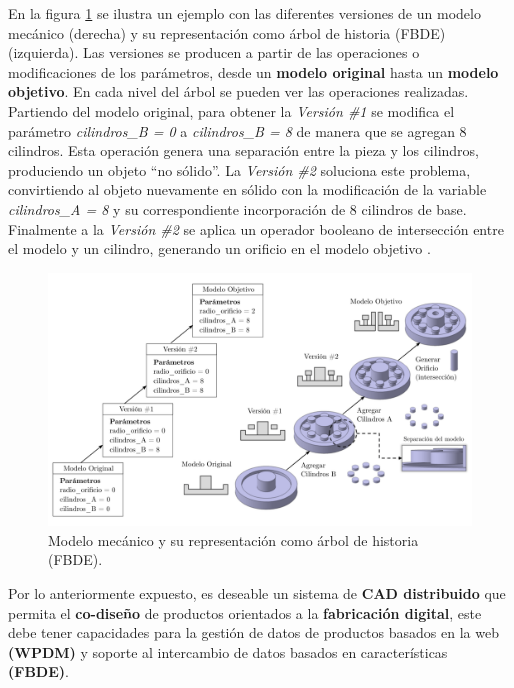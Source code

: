 En la figura \ref{fig:de2} se ilustra un ejemplo con las diferentes versiones de un modelo mecánico (derecha) y su representación como árbol de historia (FBDE) (izquierda). Las versiones se producen a partir de las operaciones o modificaciones de los parámetros, desde un \textbf{modelo original} hasta un \textbf{modelo objetivo}. En cada nivel del árbol se pueden ver las operaciones realizadas.  Partiendo del modelo original, para obtener la \textit{Versión \#1} se modifica el parámetro \textit{cilindros\_B = 0} a \textit{cilindros\_B = 8} de manera que se agregan 8 cilindros. Esta operación genera una separación entre la pieza y los cilindros, produciendo un objeto ``no sólido''. La \textit{Versión \#2} soluciona este problema, convirtiendo al objeto nuevamente en sólido con la modificación de la variable \textit{cilindros\_A = 8} y su correspondiente incorporación de 8 cilindros de base. Finalmente a la \textit{Versión \#2} se aplica un operador booleano de  intersección entre el modelo y un cilindro, generando un orificio en el modelo objetivo 
\citep{Kwon2015}.

\begin{figure}[ht]
\includegraphics[width=16cm]{Img/WEB/de-fin.png}
\centering
\caption{\footnotesize{ Modelo mecánico y su representación como árbol de historia (FBDE). }}
\label{fig:de2}
\end{figure}



Por lo anteriormente expuesto, es deseable un sistema de \textbf{CAD distribuido} que permita el \textbf{co-diseño} de productos orientados a la \textbf{fabricación digital}, este debe tener capacidades para la  gestión de datos de productos basados en la web \textbf{(WPDM)} y soporte al intercambio de datos basados en características \textbf{(FBDE)}.

